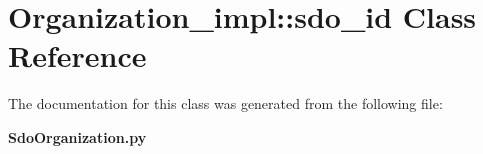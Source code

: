 \section{Organization\_\-impl::sdo\_\-id Class Reference}
\label{classOrganization__impl_1_1sdo__id}


The documentation for this class was generated from the following file:\begin{CompactItemize}
\item 
{\bf Sdo\-Organization.py}\end{CompactItemize}
